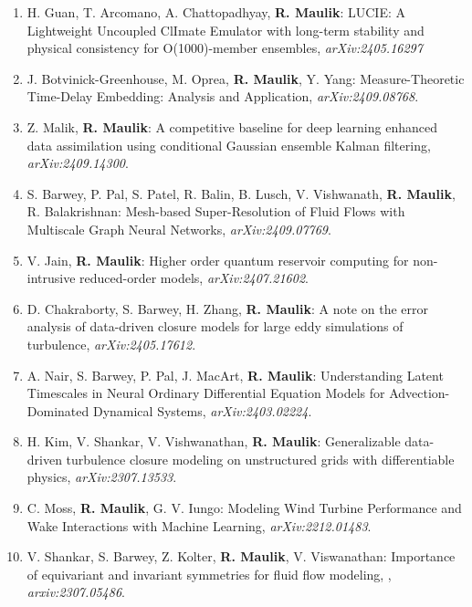 \documentclass[letterpaper]{article}
\begin{document}
\begin{enumerate}

\item H. Guan, T. Arcomano, A. Chattopadhyay, \textbf{R. Maulik}: LUCIE: A Lightweight Uncoupled ClImate Emulator with long-term stability and physical consistency for O(1000)-member ensembles, {\it arXiv:2405.16297}

\item J. Botvinick-Greenhouse, M. Oprea, \textbf{R. Maulik}, Y. Yang: Measure-Theoretic Time-Delay Embedding: Analysis and Application, {\it arXiv:2409.08768}.

\item Z. Malik, \textbf{R. Maulik}: A competitive baseline for deep learning enhanced data assimilation using conditional Gaussian ensemble Kalman filtering, {\it arXiv:2409.14300}.

\item S. Barwey, P. Pal, S. Patel, R. Balin, B. Lusch, V. Vishwanath, \textbf{R. Maulik}, R. Balakrishnan: Mesh-based Super-Resolution of Fluid Flows with Multiscale Graph Neural Networks, {\it arXiv:2409.07769}.

\item V. Jain, \textbf{R. Maulik}: Higher order quantum reservoir computing for non-intrusive reduced-order models, {\it arXiv:2407.21602}.

\item D. Chakraborty, S. Barwey, H. Zhang, \textbf{R. Maulik}: A note on the error analysis of data-driven closure models for large eddy simulations of turbulence, {\it arXiv:2405.17612}.

\item A. Nair, S. Barwey, P. Pal, J. MacArt, \textbf{R. Maulik}: Understanding Latent Timescales in Neural Ordinary Differential Equation Models for Advection-Dominated Dynamical Systems, {\it arXiv:2403.02224}.

\item H. Kim, V. Shankar, V. Vishwanathan, \textbf{R. Maulik}: Generalizable data-driven turbulence closure modeling on unstructured grids with differentiable physics, {\it arXiv:2307.13533}.

\item C. Moss, \textbf{R. Maulik}, G. V. Iungo: Modeling Wind Turbine Performance and Wake Interactions with Machine Learning, {\it arXiv:2212.01483}.

\item V. Shankar, S. Barwey,  Z. Kolter, \textbf{R. Maulik}, V. Viswanathan: Importance of equivariant and invariant symmetries for fluid flow modeling, , {\it arxiv:2307.05486}.

\end{enumerate}
\end{document}
